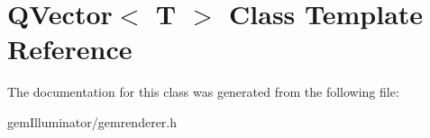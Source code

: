 \hypertarget{class_q_vector}{}\section{Q\+Vector$<$ T $>$ Class Template Reference}
\label{class_q_vector}


The documentation for this class was generated from the following file\+:\begin{DoxyCompactItemize}
\item 
gem\+Illuminator/gemrenderer.\+h\end{DoxyCompactItemize}

